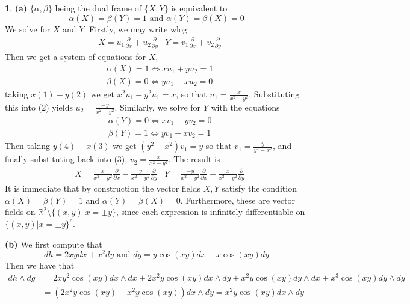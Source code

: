 \documentclass[10.5pt]{article}
\theoremstyle{definition}
\newtheorem{pb}{}
\newcommand{\set}[1]{\{#1\}}
\newcommand{\tand}{\text{ and }}
\newcommand{\parx}{\frac{\partial}{\partial x}}
\newcommand{\pary}{\frac{\partial}{\partial y}}
\begin{document}
    \begin{pb}
        \textbf{(a)}
            \(\set{\alpha,\beta}\) being the dual frame of \(\set{X,Y}\) is equivalent to
            \[\alpha(X) = \beta(Y) = 1 \tand \alpha(Y) = \beta(X) = 0\]
            We solve for \(X\) and \(Y\). Firstly, we may write wlog
            \begin{align*}
                &X = u_1\parx + u_2\pary &Y = v_1\parx + v_2\pary
            \end{align*}
            Then we get a system of equations for \(X\),
            \begin{align}
                &\alpha(X) = 1 \iff xu_1 + yu_2 = 1 \\
                &\beta(X) = 0 \iff yu_1 + xu_2 = 0
            \end{align}
            taking \(x(1) - y(2)\) we get \(x^2u_1 - y^2u_1 = x\), so that
            \(u_1 = \frac{x}{x^2 - y^2}\). Substituting this into (2) yields \(u_2 = \frac{-y}{x^2-y^2}\). Similarly, we solve for \(Y\) with the equations
            \begin{align}
                &\alpha(Y) = 0 \iff xv_1 + yv_2 = 0 \\
                &\beta(Y) = 1 \iff yv_1 + xv_2 = 1
            \end{align}
            Then taking \(y(4) - x(3)\) we get \((y^2 - x^2)v_1 = y\) so that \(v_1 = \frac{y}{y^2 - x^2}\), and finally substituting back into (3), \(v_2 = \frac{x}{x^2 - y^2}\). The result is
            \begin{align*}
                &X = \frac{x}{x^2 - y^2}\parx - \frac{y}{x^2-y^2}\pary &Y = \frac{-y}{x^2 - y^2}\parx + \frac{x}{x^2 - y^2}\pary
            \end{align*}
            It is immediate that by construction the vector fields \(X,Y\) satisfy the condition \(\alpha(X) = \beta(Y) = 1 \tand \alpha(Y) = \beta(X) = 0\). Furthermore, these are vector fields on \(\mathbb{R}^2\setminus\set{(x,y)\vert x = \pm y}\), since each expression is infinitely differentiable on \(\set{(x,y)\vert x = \pm y}^c\). 

            \textbf{(b)} We first compute that 
            \[dh = 2xy dx + x^2 dy \tand dg = y\cos(xy)dx + x\cos(xy)dy\]
            Then we have that
            \begin{align*}
                dh \wedge dg &= 2xy^2\cos(xy)dx \wedge dx + 2x^2y\cos(xy)dx \wedge dy + x^2y\cos(xy)dy\wedge dx
                + x^3\cos(xy)dy\wedge dy \\
                &= (2x^2y\cos(xy) - x^2y\cos(xy))dx\wedge dy = x^2y\cos(xy)dx\wedge dy
            \end{align*}
    \end{pb}
\end{document}
